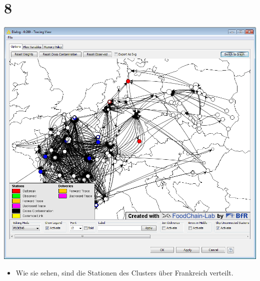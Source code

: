 \documentclass{beamer}
\begin{document}
\section{8}
\begin{frame}
	\begin{center}
  		\includegraphics[height=0.6\textheight]{8.png}
	\end{center}
	\begin{itemize}
		\item Wie sie sehen, sind die Stationen des Clusters über Frankreich verteilt.
	\end{itemize}
\end{frame}
\end{document}
